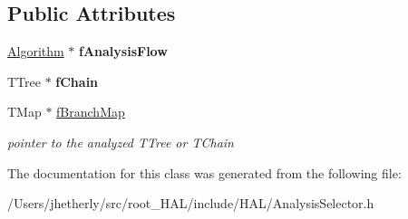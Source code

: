 \subsection*{Public Attributes}
\begin{DoxyCompactItemize}
\item 
\hypertarget{class_h_a_l_1_1_analysis_selector_a7634b6d0eb916c352968a1a6acd7f3d2}{\hyperlink{class_h_a_l_1_1_algorithm}{Algorithm} $\ast$ {\bfseries f\-Analysis\-Flow}}\label{class_h_a_l_1_1_analysis_selector_a7634b6d0eb916c352968a1a6acd7f3d2}

\item 
\hypertarget{class_h_a_l_1_1_analysis_selector_a37f6980439f0b1e94db036220eacef8f}{T\-Tree $\ast$ {\bfseries f\-Chain}}\label{class_h_a_l_1_1_analysis_selector_a37f6980439f0b1e94db036220eacef8f}

\item 
\hypertarget{class_h_a_l_1_1_analysis_selector_a4d6e0e029b502012c4bf6d4f1618625c}{T\-Map $\ast$ \hyperlink{class_h_a_l_1_1_analysis_selector_a4d6e0e029b502012c4bf6d4f1618625c}{f\-Branch\-Map}}\label{class_h_a_l_1_1_analysis_selector_a4d6e0e029b502012c4bf6d4f1618625c}

\begin{DoxyCompactList}\small\item\em pointer to the analyzed T\-Tree or T\-Chain \end{DoxyCompactList}\end{DoxyCompactItemize}


The documentation for this class was generated from the following file\-:\begin{DoxyCompactItemize}
\item 
/\-Users/jhetherly/src/root\-\_\-\-H\-A\-L/include/\-H\-A\-L/Analysis\-Selector.\-h\end{DoxyCompactItemize}
